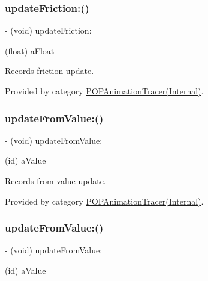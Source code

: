 \subsubsection{\texorpdfstring{update\+Friction\+:()}{updateFriction:()}\hspace{0.1cm}{\footnotesize\ttfamily [2/2]}}
{\footnotesize\ttfamily -\/ (void) update\+Friction\+: \begin{DoxyParamCaption}\item[{(float)}]{a\+Float }\end{DoxyParamCaption}}

Records friction update. 

Provided by category \mbox{\hyperlink{category_p_o_p_animation_tracer_07_internal_08_aba012bff58a203420d1adf3e922491e0}{P\+O\+P\+Animation\+Tracer(\+Internal)}}.

\mbox{\label{interface_p_o_p_animation_tracer_aa5cc867da95a73d3254f38a86281233a}} 
\subsubsection{\texorpdfstring{update\+From\+Value\+:()}{updateFromValue:()}\hspace{0.1cm}{\footnotesize\ttfamily [1/2]}}
{\footnotesize\ttfamily -\/ (void) update\+From\+Value\+: \begin{DoxyParamCaption}\item[{(id)}]{a\+Value }\end{DoxyParamCaption}}

Records from value update. 

Provided by category \mbox{\hyperlink{category_p_o_p_animation_tracer_07_internal_08_aa5cc867da95a73d3254f38a86281233a}{P\+O\+P\+Animation\+Tracer(\+Internal)}}.

\mbox{\label{interface_p_o_p_animation_tracer_aa5cc867da95a73d3254f38a86281233a}} 
\subsubsection{\texorpdfstring{update\+From\+Value\+:()}{updateFromValue:()}\hspace{0.1cm}{\footnotesize\ttfamily [2/2]}}
{\footnotesize\ttfamily -\/ (void) update\+From\+Value\+: \begin{DoxyParamCaption}\item[{(id)}]{a\+Value }\end{DoxyParamCaption}}

